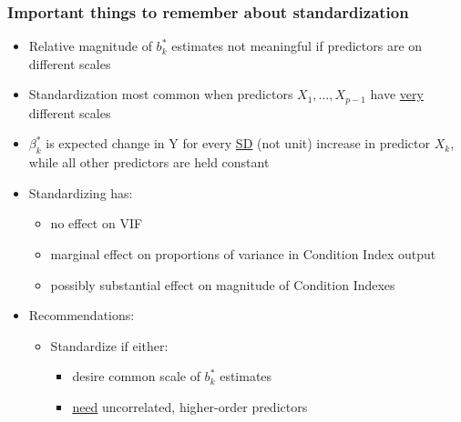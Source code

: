 \documentclass[12pt]{notes}
\begin{document}
\subsubsection{Important things to remember about standardization}
    \begin{itemize}
        \item Relative magnitude of $b^*_k$ estimates not meaningful if predictors are on different scales
        \item Standardization most common when predictors $X_1, \ldots, X_{p-1}$ have \underline{very} different scales
        \item $\beta^*_k$ is expected change in Y for every \underline{SD} (not unit) increase in predictor $X_k$,
while all other predictors are held constant
  \item Standardizing has:
      \begin{itemize}
          \item no effect on VIF
          \item marginal effect on proportions of variance in Condition Index output
          \item possibly substantial effect on magnitude of Condition Indexes
      \end{itemize}
  \item Recommendations:
     \begin{itemize}
        \item Standardize if either:
          \begin{itemize}
            \item desire common scale of $b^*_k$ estimates\\ \vspace{1em} %
            \item \underline{need} uncorrelated, higher-order predictors\\ \vspace{1em} %
          \end{itemize}
     \end{itemize}
     \end{itemize}


\vspace{1em}
\end{document}
